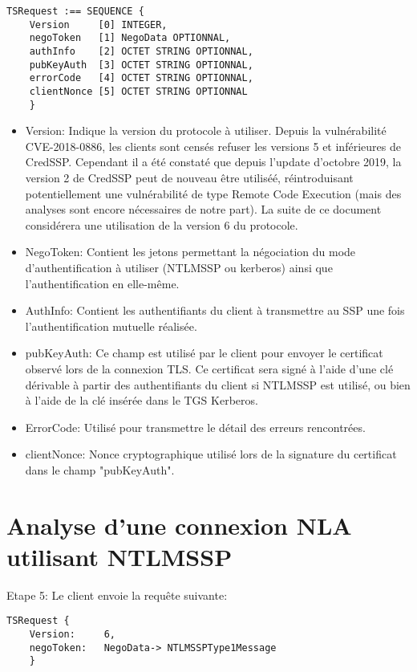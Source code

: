 \begin{lstlisting}[frame=single,basicstyle=\tiny]
TSRequest :== SEQUENCE {
	Version     [0] INTEGER,
	negoToken   [1] NegoData OPTIONNAL,
	authInfo    [2] OCTET STRING OPTIONNAL,
	pubKeyAuth  [3] OCTET STRING OPTIONNAL,
	errorCode   [4] OCTET STRING OPTIONNAL,
	clientNonce [5] OCTET STRING OPTIONNAL
	}
\end{lstlisting}


\begin{itemize}
	\item Version: Indique la version du protocole à utiliser. Depuis la vulnérabilité CVE-2018-0886, les clients sont censés refuser les versions 5 et inférieures de CredSSP. Cependant il a été constaté que depuis l’update d’octobre 2019, la version 2 de CredSSP peut de nouveau être utiliséé, réintroduisant potentiellement une vulnérabilité de type Remote Code Execution (mais des analyses sont encore nécessaires de notre part). La suite de ce document considérera une utilisation de la version 6 du protocole.
	\item NegoToken: Contient les jetons permettant la négociation du mode d'authentification à utiliser (NTLMSSP ou kerberos) ainsi que l'authentification en elle-même.
	\item AuthInfo: Contient les authentifiants du client à transmettre au SSP une fois l'authentification mutuelle réalisée. 
	\item pubKeyAuth: Ce champ est utilisé par le client pour envoyer le certificat observé lors de la connexion TLS. Ce certificat sera signé à l'aide d'une clé dérivable à partir des authentifiants du client si NTLMSSP est utilisé, ou bien à l'aide de la clé insérée dans le TGS Kerberos. 
	\item ErrorCode: Utilisé pour transmettre le détail des erreurs rencontrées.
	\item clientNonce: Nonce cryptographique utilisé lors de la signature du certificat dans le champ "pubKeyAuth".
\end{itemize}

\section{Analyse d'une connexion NLA utilisant NTLMSSP}

Etape 5: Le client envoie la requête suivante:

\begin{lstlisting}[frame=single,basicstyle=\tiny]
TSRequest {
	Version:     6,
	negoToken:   NegoData-> NTLMSSPType1Message
	}
\end{lstlisting}

